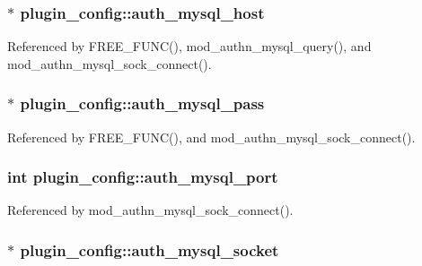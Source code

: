 \hypertarget{structplugin__config_ab8f1edb0955981b20739edb402a32e21}{
\subsubsection[{auth\-\_\-mysql\-\_\-host}]{$\ast$ plugin\-\_\-config\-::auth\-\_\-mysql\-\_\-host}}\label{structplugin__config_ab8f1edb0955981b20739edb402a32e21}


Referenced by F\-R\-E\-E\-\_\-\-F\-U\-N\-C(), mod\-\_\-authn\-\_\-mysql\-\_\-query(), and mod\-\_\-authn\-\_\-mysql\-\_\-sock\-\_\-connect().

\hypertarget{structplugin__config_abd6a87b36db03248610fd0cb3bb7032e}{
\subsubsection[{auth\-\_\-mysql\-\_\-pass}]{$\ast$ plugin\-\_\-config\-::auth\-\_\-mysql\-\_\-pass}}\label{structplugin__config_abd6a87b36db03248610fd0cb3bb7032e}


Referenced by F\-R\-E\-E\-\_\-\-F\-U\-N\-C(), and mod\-\_\-authn\-\_\-mysql\-\_\-sock\-\_\-connect().

\hypertarget{structplugin__config_a72b2a6c4b315c3ea2c9b65c87863ad19}{
\subsubsection[{auth\-\_\-mysql\-\_\-port}]{\setlength{\rightskip}{0pt plus 5cm}int plugin\-\_\-config\-::auth\-\_\-mysql\-\_\-port}}\label{structplugin__config_a72b2a6c4b315c3ea2c9b65c87863ad19}


Referenced by mod\-\_\-authn\-\_\-mysql\-\_\-sock\-\_\-connect().

\hypertarget{structplugin__config_a2ee3749c848991c3017517288d5db439}{
\subsubsection[{auth\-\_\-mysql\-\_\-socket}]{$\ast$ plugin\-\_\-config\-::auth\-\_\-mysql\-\_\-socket}}\label{structplugin__config_a2ee3749c848991c3017517288d5db439}


